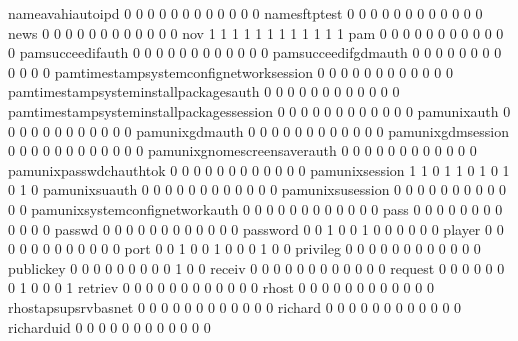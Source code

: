\documentclass[compress,8pt]{beamer}
\begin{document}
\begin{frame}
\begin{Schunk}
  nameavahiautoipd                          0  0  0  0  0  0  0  0  0  0  0  0
  namesftptest                              0  0  0  0  0  0  0  0  0  0  0  0
  news                                      0  0  0  0  0  0  0  0  0  0  0  0
  nov                                       1  1  1  1  1  1  1  1  1  1  1  1
  pam                                       0  0  0  0  0  0  0  0  0  0  0  0
  pamsucceedifauth                          0  0  0  0  0  0  0  0  0  0  0  0
  pamsucceedifgdmauth                       0  0  0  0  0  0  0  0  0  0  0  0
  pamtimestampsystemconfignetworksession    0  0  0  0  0  0  0  0  0  0  0  0
  pamtimestampsysteminstallpackagesauth     0  0  0  0  0  0  0  0  0  0  0  0
  pamtimestampsysteminstallpackagessession  0  0  0  0  0  0  0  0  0  0  0  0
  pamunixauth                               0  0  0  0  0  0  0  0  0  0  0  0
  pamunixgdmauth                            0  0  0  0  0  0  0  0  0  0  0  0
  pamunixgdmsession                         0  0  0  0  0  0  0  0  0  0  0  0
  pamunixgnomescreensaverauth               0  0  0  0  0  0  0  0  0  0  0  0
  pamunixpasswdchauthtok                    0  0  0  0  0  0  0  0  0  0  0  0
  pamunixsession                            1  1  0  1  1  0  1  0  1  0  1  0
  pamunixsuauth                             0  0  0  0  0  0  0  0  0  0  0  0
  pamunixsusession                          0  0  0  0  0  0  0  0  0  0  0  0
  pamunixsystemconfignetworkauth            0  0  0  0  0  0  0  0  0  0  0  0
  pass                                      0  0  0  0  0  0  0  0  0  0  0  0
  passwd                                    0  0  0  0  0  0  0  0  0  0  0  0
  password                                  0  0  1  0  0  1  0  0  0  0  0  0
  player                                    0  0  0  0  0  0  0  0  0  0  0  0
  port                                      0  0  1  0  0  1  0  0  0  1  0  0
  privileg                                  0  0  0  0  0  0  0  0  0  0  0  0
  publickey                                 0  0  0  0  0  0  0  0  0  1  0  0
  receiv                                    0  0  0  0  0  0  0  0  0  0  0  0
  request                                   0  0  0  0  0  0  0  1  0  0  0  1
  retriev                                   0  0  0  0  0  0  0  0  0  0  0  0
  rhost                                     0  0  0  0  0  0  0  0  0  0  0  0
  rhostapsupsrvbasnet                       0  0  0  0  0  0  0  0  0  0  0  0
  richard                                   0  0  0  0  0  0  0  0  0  0  0  0
  richarduid                                0  0  0  0  0  0  0  0  0  0  0  0

\end{Schunk}
\end{frame}
\end{document}
